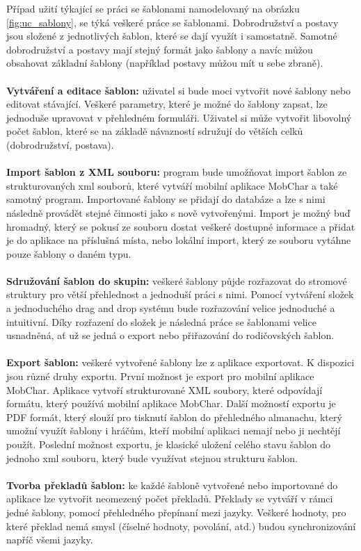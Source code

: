 \documentclass[thesis=B,czech]{resources/FITthesis}[2012/06/26]
\begin{document}
Případ užití týkající se práci se šablonami namodelovaný na obrázku \ref{fig:uc_sablony}, se týká veškeré práce se šablonami. Dobrodružství a postavy jsou složené z jednotlivých šablon, které se dají využít i samostatně. Samotné dobrodružství a postavy mají stejný formát jako šablony a navíc můžou obsahovat základní šablony (například postavy můžou mít u sebe zbraně).\\
\\
\textbf{Vytváření a editace šablon:} uživatel si bude moci vytvořit nové šablony nebo editovat stávající. Veškeré parametry, které je možné do šablony zapsat, lze jednoduše upravovat v přehledném formuláři. Uživatel si může vytvořit libovolný počet šablon, které se na základě návazností sdružují do větších celků (dobrodružství, postava).\\
\\
\textbf{Import šablon z XML souboru:} program bude umožňovat import šablon ze strukturovaných xml souborů, které vytváří mobilní aplikace MobChar a také samotný program. Importované šablony se přidají do databáze a lze s nimi následně provádět stejné činnosti jako s nově vytvořenými. Import je možný buď hromadný, který se pokusí ze souboru dostat veškeré dostupné informace a přidat je do aplikace na příslušná místa, nebo lokální import, který ze souboru vytáhne pouze šablony o daném typu.\\
\\
\textbf{Sdružování šablon do skupin:} veškeré šablony půjde rozřazovat do stromové struktury pro větší přehlednost a jednoduší práci s nimi. Pomocí vytváření složek a jednoduchého drag and drop systému bude rozřazování velice jednoduché a intuitivní. Díky rozřazení do složek je následná práce se šablonami velice usnadněná, ať už se jedná o export nebo přiřazování do rodičovských šablon.\\
\\
\textbf{Export šablon:} veškeré vytvořené šablony lze z aplikace exportovat. K dispozici jsou různé druhy exportu. První možnost je export pro mobilní aplikace MobChar. Aplikace vytvoří strukturované XML soubory, které odpovídají formátu, který používá mobilní aplikace MobChar. Další možností exportu je PDF formát, který slouží pro tisknutí šablon do přehledného almanachu, který umožní využít šablony i hráčům, kteří mobilní aplikaci nemají nebo ji nechtějí použít. Poslední možnost exportu, je klasické uložení celého stavu šablon do jednoho xml souboru, který bude využívat stejnou strukturu šablon. \\
\\
\textbf{Tvorba překladů šablon:} ke každé šabloně vytvořené nebo importované do aplikace lze vytvořit neomezený počet překladů. Překlady se vytváří v rámci jedné šablony, pomocí přehledného přepínaní mezi jazyky. Veškeré hodnoty, pro které překlad nemá smysl (číselné hodnoty, povolání, atd.) budou synchronizování napříč všemi jazyky.\\
\\
\end{document}

